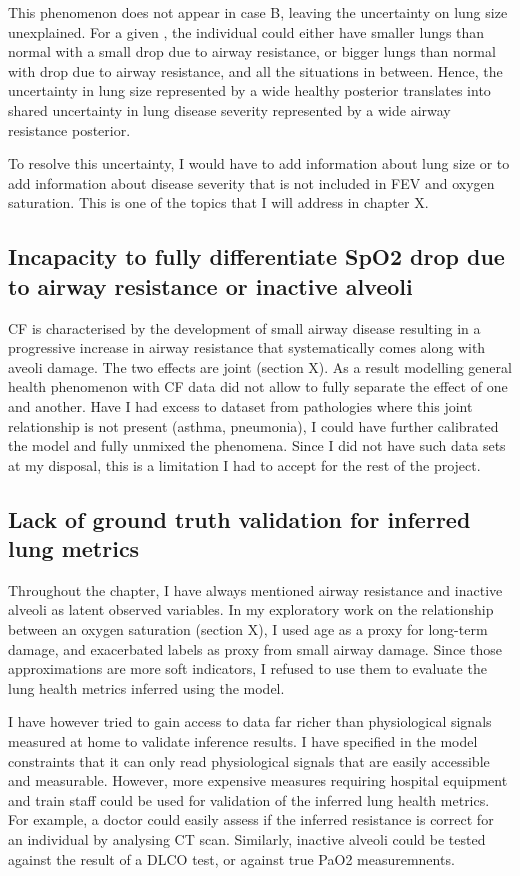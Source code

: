 This phenomenon does not appear in case B, leaving the uncertainty on lung size unexplained. For a given \F, the individual could either have smaller lungs than normal with a small drop due to airway resistance, or bigger lungs than normal with drop due to airway resistance, and all the situations in between. Hence, the uncertainty in lung size represented by a wide healthy \F posterior translates into shared uncertainty in lung disease severity represented by a wide airway resistance posterior.

To resolve this uncertainty, I would have to add information about lung size or to add information about disease severity that is not included in FEV and oxygen saturation. This is one of the topics that I will address in chapter X.

\subsection{Incapacity to fully differentiate SpO2 drop due to airway resistance or inactive alveoli}
CF is characterised by the development of small airway disease resulting in a progressive increase in airway resistance that systematically comes along with aveoli damage. The two effects are joint (section X). As a result modelling general health phenomenon with CF data did not allow to fully separate the effect of one and another. Have I had excess to dataset from pathologies where this joint relationship is not present (asthma, pneumonia), I could have further calibrated the model and fully unmixed the phenomena. Since I did not have such data sets at my disposal, this is a limitation I had to accept for the rest of the project.

\subsection{Lack of ground truth validation for inferred lung metrics}
Throughout the chapter, I have always mentioned airway resistance and inactive alveoli as latent observed variables. In my exploratory work on the relationship between \F an oxygen saturation (section X), I used age as a proxy for long-term damage, and exacerbated labels as proxy from small airway damage. Since those approximations are more soft indicators, I refused to use them to evaluate the lung health metrics inferred using the model.

I have however tried to gain access to data far richer than physiological signals measured at home to validate inference results. I have specified in the model constraints that it can only read physiological signals that are easily accessible and measurable. However, more expensive measures requiring hospital equipment and train staff could be used for validation of the inferred lung health metrics. For example, a doctor could easily assess if the inferred resistance is correct for an individual by analysing CT scan. Similarly, inactive alveoli could be tested against the result of a DLCO test, or against true PaO2 measuremnents.

